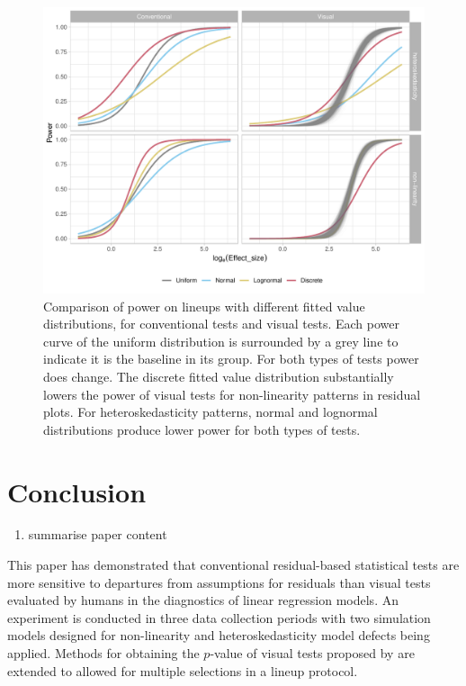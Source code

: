 \documentclass[]{interact}
\theoremstyle{plain}%
\theoremstyle{definition}
\theoremstyle{remark}
\providecommand{\tightlist}{%
  \setlength{\itemsep}{0pt}\setlength{\parskip}{0pt}}
\def\tightlist{}
\begin{document}
\begin{figure}

{\centering \includegraphics[width=1\linewidth]{paper_comparison_files/figure-latex/different-x-dist-poly-power-1} 

}

\caption{Comparison of power on lineups with different fitted value distributions, for conventional tests and visual tests. Each power curve of the uniform distribution is surrounded by a grey line to indicate it is the baseline in its group. For both types of tests power does change. The discrete fitted value distribution substantially lowers the power of visual tests for non-linearity patterns in residual plots. For heteroskedasticity patterns, normal and lognormal distributions produce lower power for both types of tests.}\label{fig:different-x-dist-poly-power}
\end{figure}

\hypertarget{conclusion}{%
\section{Conclusion}\label{conclusion}}

\begin{enumerate}
\def\labelenumi{\arabic{enumi}.}
\tightlist
\item
  summarise paper content
\end{enumerate}

This paper has demonstrated that conventional residual-based statistical
tests are more sensitive to departures from assumptions for residuals
than visual tests evaluated by humans in the diagnostics of linear
regression models. An experiment is conducted in three data collection
periods with two simulation models designed for non-linearity and
heteroskedasticity model defects being applied. Methods for obtaining
the \(p\)-value of visual tests proposed by
\citet{vanderplas2021statistical} are extended to allowed for multiple
selections in a lineup protocol.
\end{document}
